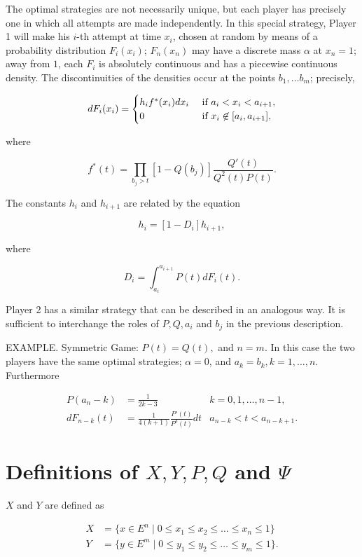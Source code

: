 \documentclass{article}
\begin{document}
The optimal strategies are not necessarily unique, but each player has
precisely one in which all attempts are made independently. In this special
strategy, Player 1 will make his $i$-th attempt at time $x_i$, chosen at random
by means of a probability distribution $F_i(x_i)$; $F_n(x_n)$ may have a
discrete mass $\alpha$ at $x_n = 1$; away from $1$, each $F_i$ is absolutely
continuous and has a piecewise continuous density. The discontinuities of the
densities occur at the points $b_1, \dots b_m$; precisely,

\[
dF_i(x_i) = \begin{cases}
h_i f^*(x_i) dx_i & \textup{ if } a_i < x_i < a_{i+1}, \\
0                 & \textup{ if } x_i \not \in [a_i, a_{i+1}], \\
\end{cases}
\]

where

\[
f^*(t) = \prod_{b_j > t} \left [ 1 - Q(b_j) \right ] \frac{Q'(t)}{Q^2(t) P(t)}.
\]

The constants $h_i$ and $h_{i+1}$ are related by the equation

\[
h_i = [1 - D_i] h_{i+1},
\]

where

\[
D_i = \int_{a_i}^{a_{i+1}} P(t) dF_i(t).
\]

Player 2 has a similar strategy that can be described in an analogous way. It
is sufficient to interchange the roles of $P, Q, a_i$ and $b_j$ in the previous
description.

EXAMPLE. Symmetric Game: $P(t) = Q(t),$ and $n = m$. In this case the two
players have the same optimal strategies; $\alpha = 0$, and $a_k = b_k, k=1,
\dots, n$. Furthermore

\[
\begin{aligned}
P(a_n-k) &= \frac{1}{2k-3} & k = 0, 1, \dots, n-1, \\
dF_{n-k}(t) &= \frac{1}{4(k+1)} \frac{P'(t)}{P^3(t)} dt & a_{n-k} < t <
a_{n-k+1}.
\end{aligned}
\]

\section{Definitions of $X, Y, P, Q$ and $\Psi$}

$X$ and $Y$ are defined as

\[
\begin{aligned}
   X &= \{ x \in E^n \mid 0 \leq x_1 \leq x_2 \leq \dots \leq x_n \leq 1 \} \\
   Y &= \{ y \in E^m \mid 0 \leq y_1 \leq y_2 \leq \dots \leq y_m \leq 1 \}.
\end{aligned}
\]
\end{document}
